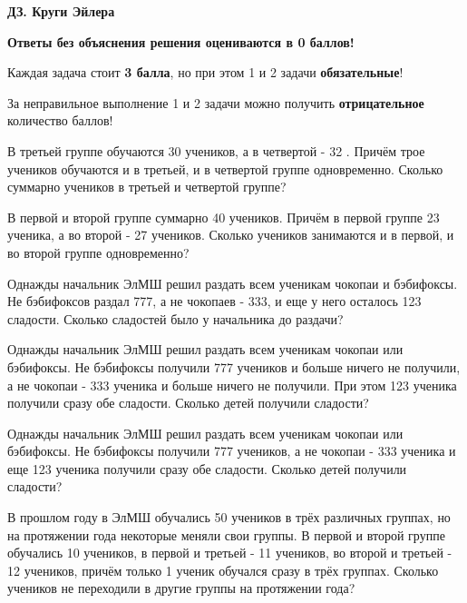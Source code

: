 \centerline{\bf \Huge ДЗ. Круги Эйлера}
\centerline{\bf \Huge }

\begin{flushright}
        \scriptsize{\textbf{Ответы без объяснения решения оцениваются в 0 баллов!}}
\end{flushright}

Каждая задача стоит \textbf{3 балла}, но при этом 1 и 2 задачи \textbf{обязательные}! 

За неправильное выполнение 1 и 2 задачи можно получить \textbf{отрицательное} количество баллов!

 В третьей группе обучаются 30 учеников, а в четвертой - 32 . Причём трое учеников обучаются и в третьей, и в четвертой группе одновременно. Сколько суммарно учеников в третьей и четвертой группе?

 В первой и второй группе суммарно 40 учеников. Причём в первой группе 23 ученика, а во второй - 27 учеников. Сколько учеников занимаются и в первой, и во второй группе одновременно?

 Однажды начальник ЭлМШ решил раздать всем ученикам чокопаи и бэбифоксы. Не бэбифоксов раздал 777, а не чокопаев - 333, и еще у него осталось 123 сладости. Сколько сладостей было у начальника до раздачи?

  Однажды начальник ЭлМШ решил раздать всем ученикам чокопаи или бэбифоксы. Не бэбифоксы получили 777 учеников и больше ничего не получили, а не чокопаи - 333 ученика и больше ничего не 
получили. При этом 123 ученика получили сразу обе сладости. Сколько детей получили сладости?

 Однажды начальник ЭлМШ решил раздать всем ученикам чокопаи или бэбифоксы. Не бэбифоксы получили 777 учеников, а не чокопаи - 333 ученика и еще 123 ученика получили сразу обе сладости. Сколько детей получили сладости?

 В прошлом году в ЭлМШ обучались 50 учеников в трёх различных группах, но на протяжении года некоторые меняли свои группы. В первой и второй группе обучались 10 учеников, в первой и третьей - 11 учеников, во второй и третьей - 12 учеников, причём только 1 ученик обучался сразу в трёх группах. Сколько учеников не переходили в другие группы на протяжении года?